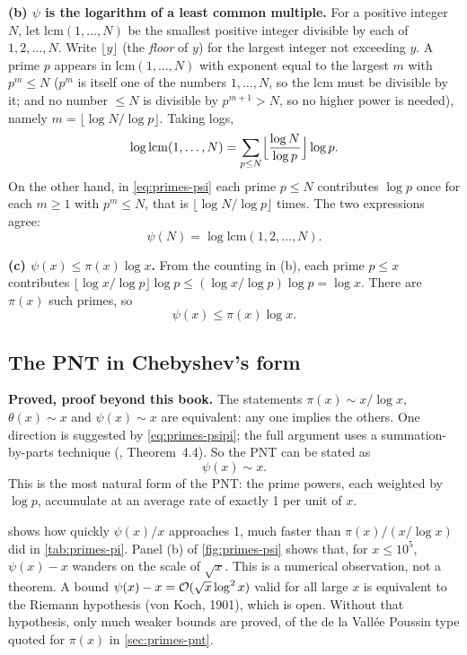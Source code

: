 \textbf{(b) $\psi$ is the logarithm of a least common multiple.} For a positive integer $N$, let $\mathrm{lcm}(1,\dots,N)$ be the smallest positive integer divisible by each of $1,2,\dots,N$. Write $\lfloor y\rfloor$ (the \emph{floor} of $y$) for the largest integer not exceeding $y$. A prime $p$ appears in $\mathrm{lcm}(1,\dots,N)$ with exponent equal to the largest $m$ with $p^m\le N$ ($p^m$ is itself one of the numbers $1,\dots,N$, so the lcm must be divisible by it; and no number $\le N$ is divisible by $p^{m+1}>N$, so no higher power is needed), namely $m=\lfloor\log N/\log p\rfloor$. Taking logs,
\[
\log\mathrm{lcm}(1,\dots,N)=\sum_{p\le N}\Bigl\lfloor\frac{\log N}{\log p}\Bigr\rfloor\log p .
\]
On the other hand, in \cref{eq:primes-psi} each prime $p\le N$ contributes $\log p$ once for each $m\ge1$ with $p^m\le N$, that is $\lfloor\log N/\log p\rfloor$ times. The two expressions agree:
\begin{equation}
\psi(N)=\log\mathrm{lcm}(1,2,\dots,N).
\label{eq:primes-lcm}
\end{equation}

\textbf{(c) $\psi(x)\le\pi(x)\log x$.} From the counting in (b), each prime $p\le x$ contributes $\lfloor\log x/\log p\rfloor\log p\le(\log x/\log p)\log p=\log x$. There are $\pi(x)$ such primes, so
\begin{equation}
\psi(x)\le\pi(x)\log x .
\label{eq:primes-psipi}
\end{equation}

\subsection{The PNT in Chebyshev's form}

\begin{beyond}
\textbf{Proved, proof beyond this book.} The statements $\pi(x)\sim x/\log x$, $\theta(x)\sim x$ and $\psi(x)\sim x$ are equivalent: any one implies the others. One direction is suggested by \cref{eq:primes-psipi}; the full argument uses a summation-by-parts technique (\cite{apostol}, Theorem~4.4). So the PNT can be stated as
\begin{equation}
\psi(x)\sim x .
\label{eq:primes-psix}
\end{equation}
This is the most natural form of the PNT: the prime powers, each weighted by $\log p$, accumulate at an average rate of exactly 1 per unit of $x$.
\end{beyond}

 shows how quickly $\psi(x)/x$ approaches 1, much faster than $\pi(x)/(x/\log x)$ did in \cref{tab:primes-pi}. Panel (b) of \cref{fig:primes-psi} shows that, for $x\le10^5$, $\psi(x)-x$ wanders on the scale of $\sqrt x$. This is a numerical observation, not a theorem. A bound $\psi(x)-x=\mathcal{O}(\sqrt x\log^2x)$ valid for all large $x$ is equivalent to the Riemann hypothesis (von Koch, 1901), which is open. Without that hypothesis, only much weaker bounds are proved, of the de la Vall\'ee Poussin type quoted for $\pi(x)$ in \cref{sec:primes-pnt}.

